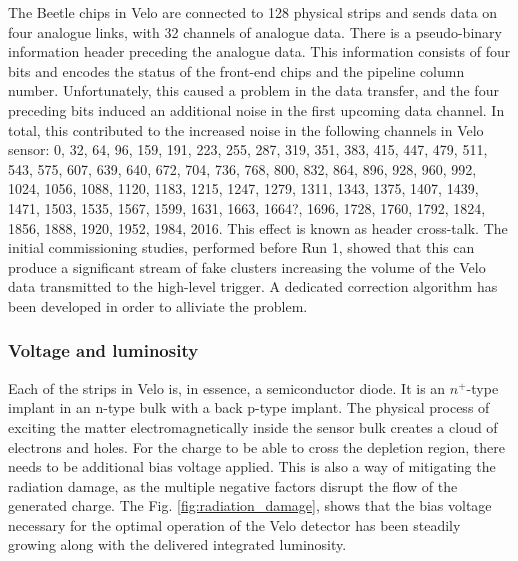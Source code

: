 The Beetle chips in Velo are connected to 128 physical strips and sends data on four analogue links, with 32 channels of analogue data.
There is a pseudo-binary information header preceding the analogue data.
This information consists of four bits and encodes the status of the front-end chips and the pipeline column number.
Unfortunately, this caused a problem in the data transfer, and the four preceding bits induced an additional noise in the first upcoming data channel.
In total, this contributed to the increased noise in the following channels in Velo sensor: 0, 32, 64, 96, 159, 191, 223, 255, 287, 319, 351, 383, 415, 447, 479, 511, 543, 575, 607, 639, 640, 672, 704, 736, 768, 800, 832, 864, 896, 928, 960, 992, 1024, 1056, 1088, 1120, 1183, 1215, 1247, 1279, 1311, 1343, 1375, 1407, 1439, 1471, 1503, 1535, 1567, 1599, 1631, 1663, 1664?, 1696, 1728, 1760, 1792, 1824, 1856, 1888, 1920, 1952, 1984, 2016.
This effect is known as header cross-talk\cite{Szumlak:1177860}. The initial commissioning studies, performed before Run 1, showed that this can produce a significant stream of fake clusters increasing the volume of the Velo data transmitted to the high-level trigger. A dedicated correction algorithm has been developed in order to alliviate the problem.

\subsubsection{Voltage and luminosity}
\label{chap2:lumivolt}

Each of the strips in Velo is, in essence, a semiconductor diode. It is an $n^{+}$-type implant in an n-type bulk with a back p-type implant\cite{Akiba:2633496}.
The physical process of exciting the matter electromagnetically inside the sensor bulk creates a cloud of electrons and holes.
For the charge to be able to cross the depletion region, there needs to be additional bias voltage applied.
This is also a way of mitigating the radiation damage, as the multiple negative factors disrupt the flow of the generated charge.
The Fig. \ref{fig:radiation_damage}, shows that the bias voltage necessary for the optimal operation of the Velo detector has been steadily growing along with the delivered integrated luminosity.

